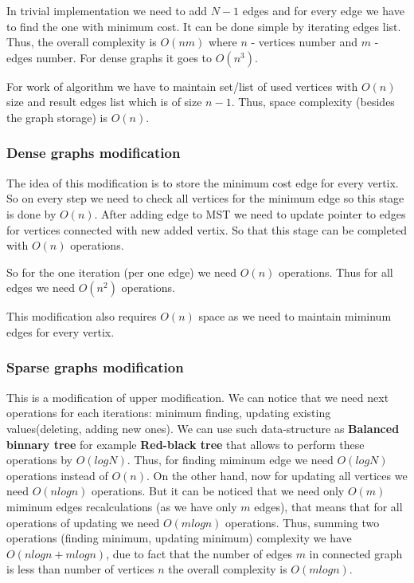 In trivial implementation we need to add $N - 1$ edges and for every edge we have to find the one with minimum cost. It can be done simple by iterating edges list. Thus, the overall complexity is $O(nm)$ where $n$ - vertices number and $m$ - edges number.
For dense graphs it goes to $O(n^3)$.

For work of algorithm we have to maintain set/list of used vertices with $O(n)$ size and result edges list which is of size $n - 1$. Thus, space complexity (besides the graph storage) is $O(n)$.

\subsubsection*{Dense graphs modification}

The idea of this modification is to store the minimum cost edge for every vertix. So on every step we need to check all vertices for the minimum edge so this stage is done by $O(n)$.
After adding edge to MST we need to update pointer to edges for vertices connected with new added vertix. So that this stage can be completed with $O(n)$ operations.

So for the one iteration (per one edge) we need $O(n)$ operations. Thus for all edges we need $O(n^2)$ operations.

This modification also requires $O(n)$ space as we need to maintain miminum edges for every vertix.

\subsubsection*{Sparse graphs modification}

This is a modification of upper modification. We can notice that we need next operations for each iterations:
minimum finding, updating existing values(deleting, adding new ones). We can use such data-structure as \textbf{Balanced binnary tree} for example \textbf{Red-black tree} that allows to perform these operations by
$O(logN)$. Thus, for finding miminum edge we need $O(logN)$ operations instead of $O(n)$. On the other hand, now for updating all vertices we need $O(nlogn)$ operations.
But it can be noticed that we need only $O(m)$ miminum edges recalculations (as we have only $m$ edges), that means that for all operations of updating we need $O(m log n)$ operations.
Thus, summing two operations (finding minimum, updating minimum) complexity we have $O(nlogn + mlogn)$, due to fact that the number of edges $m$ in connected graph is less than number of vertices $n$ the overall complexity is 
\textbf{$O(m log n)$}. 

